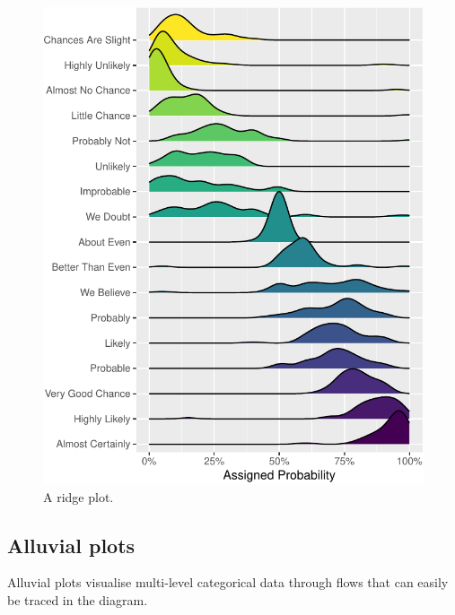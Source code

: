 \documentclass[
  english,
  doc,floatsintext]{apa6}
\begin{document}
\begin{figure}

{\centering \includegraphics[width=1\linewidth]{images/ridgeplot-1} 

}

\caption{A ridge plot.}\label{fig:ridgeplot}
\end{figure}

\hypertarget{alluvial-plots}{%
\subsection{Alluvial plots}\label{alluvial-plots}}

Alluvial plots visualise multi-level categorical data through flows that can easily be traced in the diagram.
\end{document}

